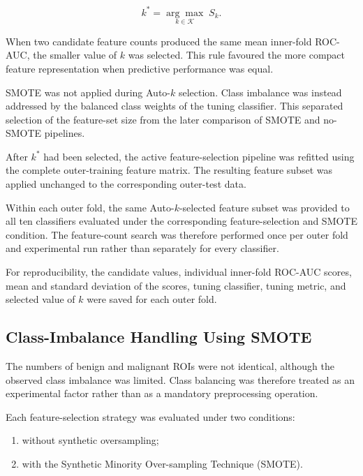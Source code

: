 \documentclass[12pt,twocolumn]{article}
\begin{document}
\begin{equation}
k^{*}
=
\underset{k\in\mathcal{K}}{\arg\max}
\; S_k.
\label{eq:auto_k_selection}
\end{equation}

When two candidate feature counts produced the same mean inner-fold
ROC-AUC, the smaller value of \(k\) was selected. This rule favoured
the more compact feature representation when predictive performance
was equal.

SMOTE was not applied during Auto-\(k\) selection. Class imbalance was
instead addressed by the balanced class weights of the tuning
classifier. This separated selection of the feature-set size from the
later comparison of SMOTE and no-SMOTE pipelines.

After \(k^{*}\) had been selected, the active feature-selection
pipeline was refitted using the complete outer-training feature matrix.
The resulting feature subset was applied unchanged to the
corresponding outer-test data.

Within each outer fold, the same Auto-\(k\)-selected feature subset was
provided to all ten classifiers evaluated under the corresponding
feature-selection and SMOTE condition. The feature-count search was
therefore performed once per outer fold and experimental run rather
than separately for every classifier.

For reproducibility, the candidate values, individual inner-fold
ROC-AUC scores, mean and standard deviation of the scores, tuning
classifier, tuning metric, and selected value of \(k\) were saved for
each outer fold.





\subsection{Class-Imbalance Handling Using SMOTE}
\label{subsec:smote}

The numbers of benign and malignant ROIs were not identical, although
the observed class imbalance was limited. Class balancing was therefore
treated as an experimental factor rather than as a mandatory
preprocessing operation.

Each feature-selection strategy was evaluated under two conditions:

\begin{enumerate}
    \item without synthetic oversampling;
    \item with the Synthetic Minority Over-sampling Technique
    (SMOTE).
\end{enumerate}
\end{document}
